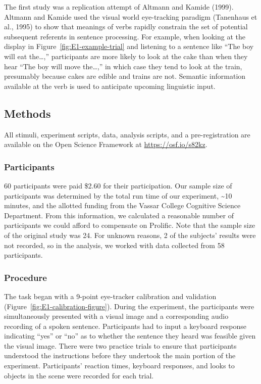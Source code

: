 \documentclass[
  man,floatsintext]{apa6}
\begin{document}
The first study was a replication attempt of
Altmann and Kamide (1999). Altmann and Kamide used the
visual world eye-tracking paradigm (Tanenhaus et al., 1995) to show that
meanings of verbs rapidly constrain the set of potential subsequent
referents in sentence processing. For example, when looking at the
display in Figure~\ref{fig:E1-example-trial} and listening to a sentence like
``The boy will eat the\ldots,'' participants are more likely to look at the cake than
when they hear ``The boy will move the\ldots,'' in which case they tend to look at the
train, presumably because cakes are edible and trains are not. Semantic
information available at the verb is used to anticipate upcoming
linguistic input.

\hypertarget{methods}{%
\subsection{Methods}\label{methods}}

All stimuli, experiment scripts, data, analysis scripts, and a
pre-registration are available on the Open Science Framework at
\url{https://osf.io/s82kz}.

\hypertarget{participants-1}{%
\subsubsection{Participants}\label{participants-1}}

60 participants were paid \$2.60 for their participation. Our sample size
of participants was determined by the total run time of our experiment,
\textasciitilde10 minutes, and the allotted funding from the Vassar College Cognitive
Science Department. From this information, we calculated a reasonable
number of participants we could afford to compensate on Prolific. Note
that the sample size of the original study was 24. For unknown reasons,
2 of the subjects' results were not recorded, so in the analysis, we
worked with data collected from 58 participants.

\hypertarget{procedure}{%
\subsubsection{Procedure}\label{procedure}}

The task began with a 9-point eye-tracker calibration
and validation (Figure~\ref{fig:E1-calibration-figure}).
During the experiment, the participants were
simultaneously presented with a visual image and a corresponding audio
recording of a spoken sentence. Participants had to input a keyboard
response indicating ``yes'' or ``no'' as to whether the sentence they heard
was feasible given the visual image. There were two practice trials to
ensure that participants understood the instructions
before they undertook the main portion of the experiment. Participants'
reaction times, keyboard responses, and looks to objects in the scene
were recorded for each trial.
\end{document}
